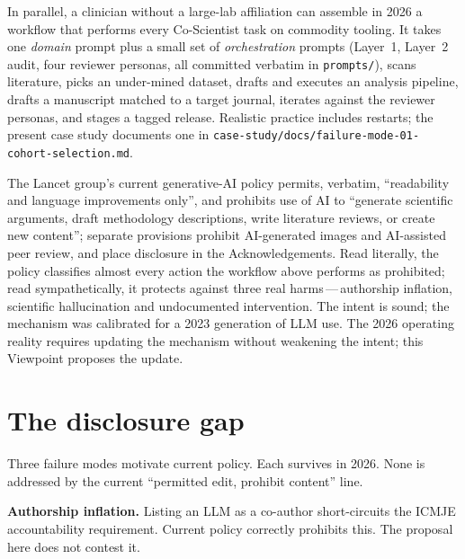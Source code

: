 \documentclass[11pt,a4paper]{article}
\begin{document}
In parallel, a clinician without a large-lab affiliation can assemble in 2026 a workflow that performs every Co-Scientist task on commodity tooling. It takes one \emph{domain} prompt plus a small set of \emph{orchestration} prompts (Layer~1, Layer~2 audit, four reviewer personas, all committed verbatim in \texttt{prompts/}), scans literature, picks an under-mined dataset, drafts and executes an analysis pipeline, drafts a manuscript matched to a target journal, iterates against the reviewer personas, and stages a tagged release. Realistic practice includes restarts; the present case study documents one in \texttt{case-study/docs/failure-mode-01-cohort-selection.md}.

The Lancet group's current generative-AI policy\citep{lancetaipolicy2024} permits, verbatim, ``readability and language improvements only'', and prohibits use of AI to ``generate scientific arguments, draft methodology descriptions, write literature reviews, or create new content''; separate provisions prohibit AI-generated images and AI-assisted peer review, and place disclosure in the Acknowledgements. Read literally, the policy classifies almost every action the workflow above performs as prohibited; read sympathetically, it protects against three real harms\,---\,authorship inflation\citep{icmje2024}, scientific hallucination\citep{luSakana2026,zhaoHallucinations2026} and undocumented intervention. The intent is sound; the mechanism was calibrated for a 2023 generation of LLM use. The 2026 operating reality requires updating the mechanism without weakening the intent; this Viewpoint proposes the update.

\section{The disclosure gap}\label{sec:gap}

Three failure modes motivate current policy. Each survives in 2026. None is addressed by the current ``permitted edit, prohibit content'' line.

\textbf{Authorship inflation.} Listing an LLM as a co-author short-circuits the ICMJE accountability requirement\citep{icmje2024}. Current policy correctly prohibits this. The proposal here does not contest it.
\end{document}
